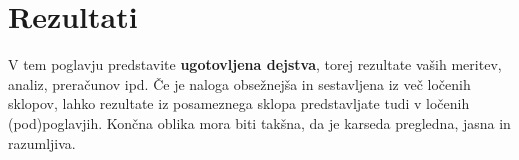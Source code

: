 \chapter{Rezultati}\label{cha:rezultati}

V tem poglavju predstavite \textbf{ugotovljena dejstva}, torej rezultate vaših meritev, analiz, preračunov ipd. Če je naloga obsežnejša in sestavljena iz več ločenih sklopov, lahko rezultate iz posameznega sklopa predstavljate tudi v ločenih (pod)poglavjih. Končna oblika mora biti takšna, da je karseda pregledna, jasna in razumljiva.
